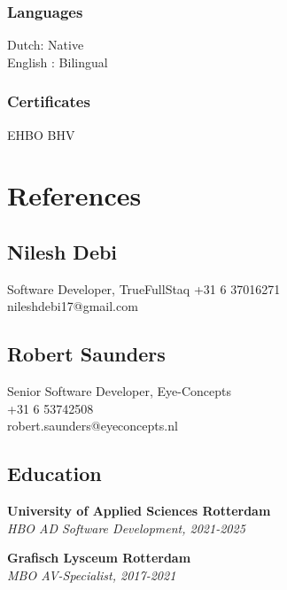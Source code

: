 \documentclass[11pt, twoside, a4paper, titlepage]{article}
\begin{document}
\begin{tcolorbox}[boxsep=0mm, left=0mm, right=0mm, top=0mm, bottom=0mm, height=23.5cm]
\begin{minipage}[t]{6.01cm}
\begin{tcolorbox}[colframe=black, colback=black, arc=0mm, sharp corners, fontupper=\color{white}, height=23.4cm]
			\subsubsection{Languages}
			Dutch: Native\\
			English : Bilingual
			
			\subsubsection{Certificates}
			EHBO
			BHV
			
			\section{References}
			\subsection{Nilesh Debi}
			Software Developer, TrueFullStaq
			+31 6 37016271\\
			nileshdebi17@gmail.com\\
			
			\subsection{Robert Saunders}
			Senior Software Developer, Eye-Concepts\\
			+31 6 53742508\\
			robert.saunders@eyeconcepts.nl\\
		\end{tcolorbox}
	\end{minipage}
	\vspace*{-0.3cm}
	\begin{minipage}[t]{14cm}
		\begin{tcolorbox}[grow to left by=0.0cm, colframe=white, colback=white, height=23.4cm]
			\section*{Education}
			\textbf{University of Applied Sciences Rotterdam}\\
			\emph{HBO AD Software Development, 2021-2025}
			
			\vspace*{0.3cm}
			
			\textbf{Grafisch Lysceum Rotterdam}\\
			\emph{MBO AV-Specialist, 2017-2021}
			
			\vspace*{0.3cm}
			

\end{tcolorbox}
\end{minipage}
\end{tcolorbox}
\end{document}
